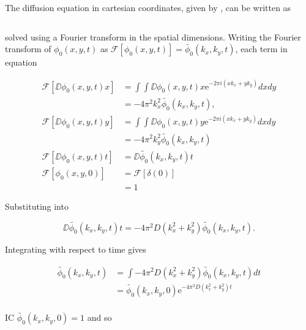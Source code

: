 The diffusion equation in cartesian coordinates, given by , can be written as

\begin{equation}

\end{equation}


 solved using a Fourier transform in the spatial dimensions. Writing the Fourier transform of $\phi_0(x,y,t)$ as $\mathscr{F}\left[ \phi_0(x,y,t) \right] = \tilde{\phi_0}(k_x,k_y,t)$, each term in equation

\begin{equation}
\begin{split}
  \mathscr{F}\left[ \DD{\phi_0(x,y,t)}{x} \right] &= \int \int \DD{\phi_0(x,y,t)}{x} \mathrm{e}^{-2\pi i(xk_x + yk_y)} dx dy \\
  &= -4\pi^2k_x^2 \tilde{\phi_0}(k_x,k_y,t), \\
  \mathscr{F}\left[ \DD{\phi_0(x,y,t)}{y} \right] &= \int \int \DD{\phi_0(x,y,t)}{y} \mathrm{e}^{-2\pi i(xk_x + yk_y)} dx dy \\
  &= -4\pi^2k_y^2 \tilde{\phi_0}(k_x,k_y,t) \\
  \mathscr{F}\left[\DD{\phi_0(x,y,t)}{t}\right] &= \DD{\tilde{\phi_0}(k_x,k_y,t)}{t} \\
  \mathscr{F}\left[\phi_0(x,y,0)\right] &= \mathscr{F}\left[\delta(0)\right] \\
  &= 1
\end{split}
\end{equation}


Substituting into 

\begin{equation}
  \DD{\tilde{\phi_0}(k_x,k_y,t)}{t} = -4\pi^2D (k_x^2 + k_y^2) \tilde{\phi_0}(k_x,k_y,t).
\end{equation}

Integrating with respect to time gives

\begin{equation}
\begin{split}
  \tilde{\phi_0}(k_x,k_y,t) &= \int -4\pi^2D (k_x^2 + k_y^2) \tilde{\phi_0}(k_x,k_y,t) dt \\
  &= \tilde{\phi_0}(k_x,k_y,0)\mathrm{e}^{-4\pi^2D(k_x^2 + k_y^2)t} \\
\end{split}
\end{equation}

IC $ \tilde{\phi_0}(k_x,k_y,0) = 1$ and so


